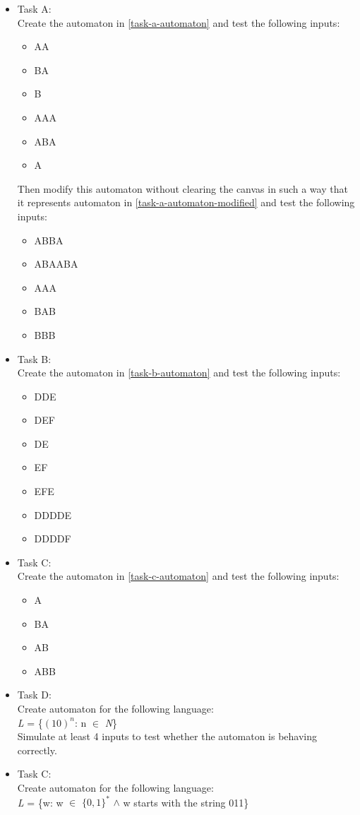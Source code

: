 \begin{itemize}
    \item Task A:\\ 
    Create the automaton in \ref{task-a-automaton} and test the following inputs:
    \begin{itemize}
        \item AA
        \item BA
        \item B
        \item AAA
        \item ABA
        \item A
    \end{itemize}
    Then modify this automaton without clearing the canvas in such a way that it represents automaton in \ref{task-a-automaton-modified} and test the following inputs:
    \begin{itemize}
        \item ABBA
        \item ABAABA
        \item AAA
        \item BAB
        \item BBB
    \end{itemize}
    \item Task B:\\ 
    Create the automaton in \ref{task-b-automaton} and test the following inputs:
    \begin{itemize}
        \item DDE
        \item DEF
        \item DE
        \item EF
        \item EFE
        \item DDDDE
        \item DDDDF
    \end{itemize}
    \item Task C:\\ 
    Create the automaton in \ref{task-c-automaton} and test the following inputs:
    \begin{itemize}
        \item A
        \item BA
        \item AB
        \item ABB
    \end{itemize}
    \item Task D:\\
    Create automaton for the following language:\\
    \textit{L} = \{$(10)^{n}$: n $\in$ \textit{N}\}\\
    Simulate at least 4 inputs to test whether the automaton is behaving correctly.
    \item Task C:\\
    Create automaton for the following language:\\
    \textit{L} = \{w: w $\in$ $\{0,1\}^{*}$ $\wedge$ w starts with the string 011\}
\end{itemize}

